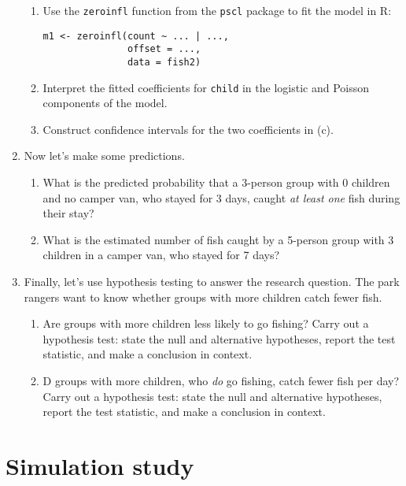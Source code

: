 \documentclass[11pt]{article}
\begin{document}
\begin{enumerate}
\begin{enumerate}
\item Use the \texttt{zeroinfl} function from the \texttt{pscl} package to fit the model in R:

\begin{verbatim}
m1 <- zeroinfl(count ~ ... | ...,
               offset = ...,
               data = fish2)
\end{verbatim}

\item Interpret the fitted coefficients for \texttt{child} in the logistic and Poisson components of the model.

\item Construct confidence intervals for the two coefficients in (c).
\end{enumerate}

\item Now let's make some predictions.

\begin{enumerate}
\item What is the predicted probability that a 3-person group with 0 children and no camper van, who stayed for 3 days, caught \textit{at least one} fish during their stay?

\item What is the estimated number of fish caught by a 5-person group with 3 children in a camper van, who stayed for 7 days?
\end{enumerate}

\item Finally, let's use hypothesis testing to answer the research question. The park rangers want to know whether groups with more children catch fewer fish.

\begin{enumerate}
\item Are groups with more children less likely to go fishing? Carry out a hypothesis test: state the null and alternative hypotheses, report the test statistic, and make a conclusion in context.

\item D groups with more children, who \textit{do} go fishing, catch fewer fish per day? Carry out a hypothesis test: state the null and alternative hypotheses, report the test statistic, and make a conclusion in context.
\end{enumerate}

\end{enumerate}

\newpage

\section*{Simulation study}
\end{document}

